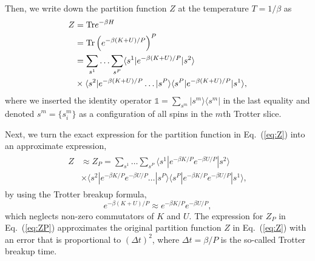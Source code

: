 \documentclass[aps,prd,twocolumn, superscriptaddress,preprintnumbers, nofootinbib,longbibliography,floatfix]{revtex4-2}
\DeclareRobustCommand{\Eq}[1]{Eq.~(\ref{#1})}
\begin{document}
Then, we write down the partition function $Z$ at the temperature $T=1/\beta$ as
%
\begin{align}
\begin{split}
Z&={\rm Tr} e^{-\beta H}\\
&={\rm Tr} \left(e^{-\beta (K+U)/P}\right)^P\\
&= \sum_{s^1}\ldots\sum_{s^P}\langle s^1| e^{-\beta (K+U)/P} | s^2\rangle\\
& \times \langle s^2| e^{-\beta (K+U)/P} \ldots | s^P\rangle \langle s^P| e^{-\beta (K+U)/P} | s^1\rangle ,
\end{split}
\label{eq:Z}
\end{align}
%
where we inserted the identity operator $\mathds{1}=\sum_{s^m} |s^m\rangle\langle s^m|$ in the last equality and denoted $s^m=\{ s_i^m\}$ as a configuration of all spins in the $m$th Trotter slice.

Next, we turn the exact expression for the partition function in \Eq{eq:Z} into an approximate expression,
%
\begin{align}
\begin{split}
Z&\approx Z_P= \sum_{s^1}\ldots\sum_{s^P}\langle s^1| e^{-\beta K/P}e^{-\beta U/P} | s^2\rangle\\
& \times \langle s^2| e^{-\beta K/P}e^{-\beta U/P} \ldots | s^P\rangle \langle s^P| e^{-\beta K/P}e^{-\beta U/P} | s^1\rangle,
\end{split}
\label{eq:ZP}
\end{align}
%
by using the Trotter breakup formula,
%
\begin{equation}
e^{-\beta (K+U)/P}\approx e^{-\beta K/P}e^{-\beta U/P},
\end{equation}
%
which neglects non-zero commutators of $K$ and $U$. The expression for $Z_P$ in \Eq{eq:ZP} approximates the original partition function $Z$ in \Eq{eq:Z} with an error that is proportional to $(\Delta t)^2$, where $\Delta t= \beta/P$ is the so-called Trotter breakup time.
\end{document}
